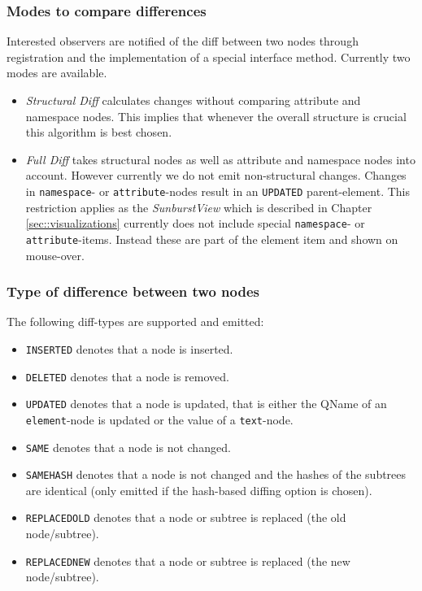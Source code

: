 \subsubsection{Modes to compare differences} Interested observers are notified of the diff between two nodes through registration and the implementation of a special interface method. Currently two modes are available.

\begin{itemize}
\item \emph{Structural Diff} calculates changes without comparing attribute and namespace nodes. This implies that whenever the overall structure is crucial this algorithm is best chosen.
\item \emph{Full Diff} takes structural nodes as well as attribute and namespace nodes into account. However currently we do not emit non-structural changes. Changes in \texttt{namespace}- or \texttt{attribute}-nodes result in an \texttt{UPDATED} parent-element. This restriction applies as the \emph{SunburstView} which is described in Chapter \ref{sec::visualizations} currently does not include special \texttt{namespace}- or \texttt{attribute}-items. Instead these are part of the element item and shown on mouse-over.
\end{itemize}

\subsubsection{Type of difference between two nodes} The following diff-types are supported and emitted:

\begin{itemize}
\item \texttt{INSERTED} denotes that a node is inserted.
\item \texttt{DELETED} denotes that a node is removed.
\item \texttt{UPDATED} denotes that a node is updated, that is either the QName of an \texttt{element}-node is updated or the value of a \texttt{text}-node.
\item \texttt{SAME} denotes that a node is not changed.
\item \texttt{SAMEHASH} denotes that a node is not changed and the hashes of the subtrees are identical (only emitted if the hash-based diffing option is chosen).
\item \texttt{REPLACEDOLD} denotes that a node or subtree is replaced (the old node/subtree).
\item \texttt{REPLACEDNEW} denotes that a node or subtree is replaced (the new node/subtree).
\end{itemize}

